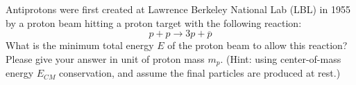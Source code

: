 \documentclass{article}
\begin{document}
\newpage
\begin{problem}
    Antiprotons were first created at Lawrence Berkeley National Lab (LBL) in 1955 by a proton beam hitting a proton target with the following reaction:  
    $$p+p\rightarrow 3p+\overline{p}$$  What is the minimum total energy $E$ of the proton beam to allow this reaction? Please give your answer in unit of proton mass $m_p$. (Hint: using center-of-mass energy $E_{CM}$ conservation, and assume the final particles are produced at rest.)
    \answerline
\end{problem}
\end{document}
